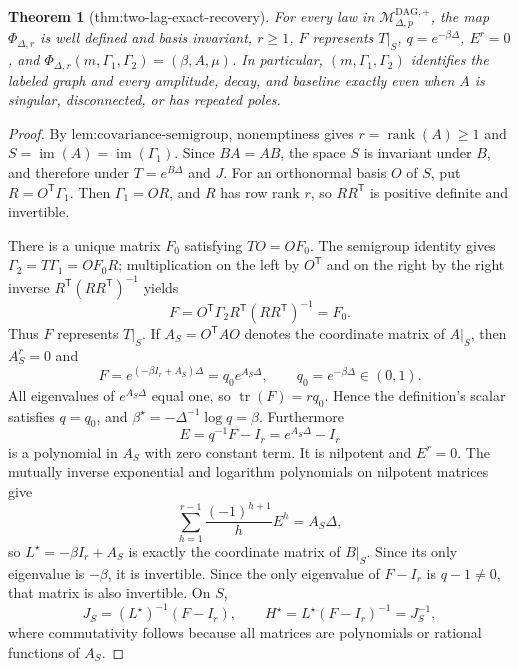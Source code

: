 \documentclass{article}
\newtheorem{theorem}{Theorem}
\begin{document}
\begin{theorem}[thm:two-lag-exact-recovery]\label{thm:two-lag-exact-recovery}
For every law in \(\mathcal M_{\Delta,p}^{\mathrm{DAG},+}\), the map \(\Phi_{\Delta,r}\) is well defined and basis invariant, \(r\geq1\), \(F\) represents \(T|_S\), \(q=e^{-\beta\Delta}\), \(E^r=0\), and \(\Phi_{\Delta,r}(m,\Gamma_1,\Gamma_2)=(\beta,A,\mu)\). In particular, \((m,\Gamma_1,\Gamma_2)\) identifies the labeled graph and every amplitude, decay, and baseline exactly even when \(A\) is singular, disconnected, or has repeated poles.
\end{theorem}
\begin{proof}
By \(\text{lem:covariance-semigroup}\), nonemptiness gives \(r=\operatorname{rank}(A)\geq1\) and \(S=\operatorname{im}(A)=\operatorname{im}(\Gamma_1)\).  Since \(BA=AB\), the space \(S\) is invariant under \(B\), and therefore under \(T=e^{B\Delta}\) and \(J\).  For an orthonormal basis \(O\) of \(S\), put \(R=O^{\mathsf T}\Gamma_1\).  Then \(\Gamma_1=OR\), and \(R\) has row rank \(r\), so \(RR^{\mathsf T}\) is positive definite and invertible.

There is a unique matrix \(F_0\) satisfying \(TO=OF_0\).  The semigroup identity gives \(\Gamma_2=T\Gamma_1=OF_0R\); multiplication on the left by \(O^{\mathsf T}\) and on the right by the right inverse \(R^{\mathsf T}(RR^{\mathsf T})^{-1}\) yields
\[
 F=O^{\mathsf T}\Gamma_2R^{\mathsf T}(RR^{\mathsf T})^{-1}=F_0.
\]
Thus \(F\) represents \(T|_S\).  If \(A_S=O^{\mathsf T}AO\) denotes the coordinate matrix of \(A|_S\), then \(A_S^r=0\) and
\[
 F=e^{(-\beta I_r+A_S)\Delta}=q_0e^{A_S\Delta},\qquad q_0=e^{-\beta\Delta}\in(0,1).
\]
All eigenvalues of \(e^{A_S\Delta}\) equal one, so \(\operatorname{tr}(F)=rq_0\).  Hence the definition's scalar satisfies \(q=q_0\), and \(\beta^\star=-\Delta^{-1}\log q=\beta\).  Furthermore
\[
 E=q^{-1}F-I_r=e^{A_S\Delta}-I_r
\]
is a polynomial in \(A_S\) with zero constant term.  It is nilpotent and \(E^r=0\).  The mutually inverse exponential and logarithm polynomials on nilpotent matrices give
\[
 \sum_{h=1}^{r-1}\frac{(-1)^{h+1}}hE^h=A_S\Delta,
\]
so \(L^\star=-\beta I_r+A_S\) is exactly the coordinate matrix of \(B|_S\).  Since its only eigenvalue is \(-\beta\), it is invertible.  Since the only eigenvalue of \(F-I_r\) is \(q-1\neq0\), that matrix is also invertible.  On \(S\),
\[
 J_S=(L^\star)^{-1}(F-I_r),\qquad H^\star=L^\star(F-I_r)^{-1}=J_S^{-1},
\]
where commutativity follows because all matrices are polynomials or rational functions of \(A_S\).


\end{proof}
\end{document}
